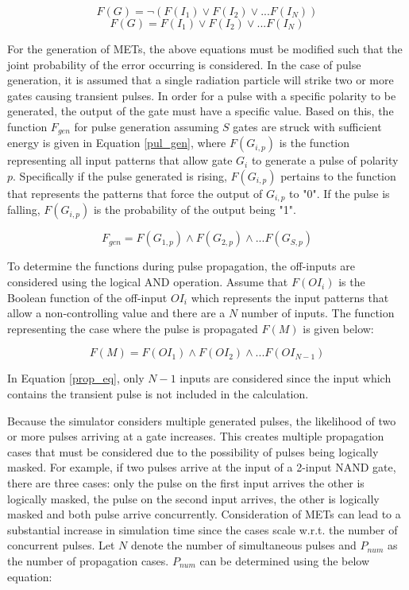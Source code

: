 \documentclass[conference]{IEEEtran}
\newcommand{\squeezeup}{\vspace{-2mm}}
\begin{document}
\small
\begin{equation} \label{OR_RISING}
F(G) = \lnot (F(I_1) \lor F(I_2) \lor ... F(I_N))
\end{equation}
\squeezeup
\begin{equation} \label{OR_FALLING}
F(G) = F(I_1) \lor F(I_2) \lor ... F(I_N)
\end{equation}
\normalsize

For the generation of METs, the above equations must be modified such that the joint probability of the error occurring is considered. In the case of pulse generation, it is assumed that a single radiation particle will strike two or more gates causing transient pulses. In order for a pulse with a specific polarity to be generated, the output of the gate must have a specific value. Based on this, the function $F_{gen}$ for pulse generation assuming $S$ gates are struck with sufficient energy is given in Equation \ref{pul_gen}, where $F(G_{i,p})$ is the function representing all input patterns that allow gate $G_i$ to generate a pulse of polarity $p$. Specifically if the pulse generated is rising, $F(G_{i,p})$ pertains to the function that represents the patterns that force the output of $G_{i,p}$ to "0". If the pulse is falling, $F(G_{i,p})$ is the probability of the output being "1".

\small
\begin{equation} \label{pul_gen}
F_{gen} = F(G_{1, p}) \land F(G_{2, p}) \land ... F(G_{S, p})
\end{equation}
\normalsize

To determine the functions during pulse propagation, the off-inputs are considered using the logical AND operation. Assume that $F(OI_i)$ is the Boolean function of the off-input $OI_i$ which represents the input patterns that allow a non-controlling value and there are a $N$ number of inputs. The function representing the case where the pulse is propagated $F(M)$ is given below:

\small
\begin{equation} \label{prop_eq}
F(M) = F(OI_1) \land F(OI_2) \land ... F(OI_{N-1})
\end{equation}
\normalsize

In Equation \ref{prop_eq}, only $N-1$ inputs are considered since the input which contains the transient pulse is not included in the calculation. 

Because the simulator considers multiple generated pulses, the likelihood of two or more pulses arriving at a gate increases. This creates multiple propagation cases that must be considered due to the possibility of pulses being logically masked. For example, if two pulses arrive at the input of a 2-input NAND gate, there are three cases: only the pulse on the first input arrives the other is logically masked, the pulse on the second input arrives, the other is logically masked and both pulse arrive concurrently. Consideration of METs can lead to a substantial increase in simulation time since the cases scale w.r.t. the number of concurrent pulses. Let $N$ denote the number of simultaneous pulses and $P_{num}$ as the number of propagation cases. $P_{num}$ can be determined using the below equation:
\end{document}
